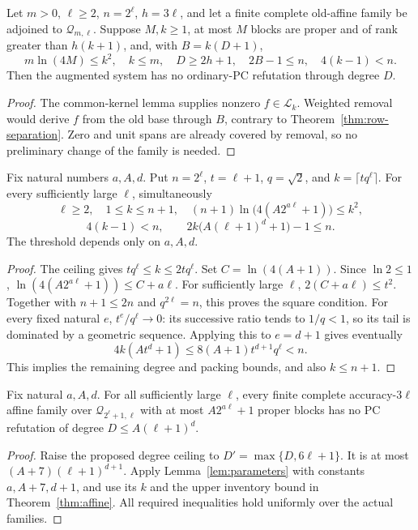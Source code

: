 \begin{theorem}\label{thm:affine}
Let \(m>0\), \(\ell\ge2\), \(n=2^\ell\), \(h=3\ell\), and let a finite
complete old-affine family be adjoined to \(\mathcal Q_{m,\ell}\).
Suppose \(M,k\ge1\), at most \(M\) blocks are proper and of rank greater
than \(h(k+1)\), and, with \(B=k(D+1)\),
\begin{equation}\label{eq:affine-room}
 m\ln(4M)\le k^2,\quad k\le m,\quad D\ge2h+1,\quad
 2B-1\le n,\quad4(k-1)<n.
\end{equation}
Then the augmented system has no ordinary-PC refutation through degree \(D\).
\end{theorem}
\begin{proof}
The common-kernel lemma supplies nonzero \(f\in\mathcal L_k\).
Weighted removal would derive \(f\) from the old base through \(B\),
contrary to Theorem~\ref{thm:row-separation}. Zero and unit spans are
already covered by removal, so no preliminary change of the family is needed.
\end{proof}

\begin{lemma}\label{lem:parameters}
Fix natural numbers \(a,A,d\). Put \(n=2^\ell\), \(t=\ell+1\),
\(q=\sqrt2\), and \(k=\lceil t q^\ell\rceil\).
For every sufficiently large \(\ell\), simultaneously
\[
 \ell\ge2,\quad 1\le k\le n+1,\quad
 (n+1)\ln\bigl(4(A2^{a\ell}+1)\bigr)\le k^2,
\]
\[
 4(k-1)<n,\qquad 2k\bigl(A(\ell+1)^d+1\bigr)-1\le n.
\]
The threshold depends only on \(a,A,d\).
\end{lemma}
\begin{proof}
The ceiling gives \(tq^\ell\le k\le2tq^\ell\).
Set \(C=\ln(4(A+1))\). Since \(\ln2\le1\),
\(\ln(4(A2^{a\ell}+1))\le C+a\ell\).
For sufficiently large \(\ell\), \(2(C+a\ell)\le t^2\).
Together with \(n+1\le2n\) and \(q^{2\ell}=n\), this proves the
square condition. For every fixed natural \(e\),
\(t^e/q^\ell\longrightarrow0\): its successive ratio tends to
\(1/q<1\), so its tail is dominated by a geometric sequence.
Applying this to \(e=d+1\) gives eventually
\[
 4k(At^d+1)\le8(A+1)t^{d+1}q^\ell<n.
\]
This implies the remaining degree and packing bounds, and also \(k\le n+1\).
\end{proof}

\begin{corollary}
\label{cor:polylog-exclusion}
Fix natural \(a,A,d\). For all sufficiently large \(\ell\), every finite
complete accuracy-\(3\ell\) affine family over \(\mathcal Q_{2^\ell+1,\ell}\)
with at most \(A2^{a\ell}+1\) proper blocks has no PC refutation of degree
\(D\le A(\ell+1)^d\).
\end{corollary}
\begin{proof}
Raise the proposed degree ceiling to \(D'=\max\{D,6\ell+1\}\).
It is at most \((A+7)(\ell+1)^{d+1}\). Apply
Lemma~\ref{lem:parameters} with constants \(a,A+7,d+1\), and use its
\(k\) and the upper inventory bound in Theorem~\ref{thm:affine}.
All required inequalities hold uniformly over the actual families.
\end{proof}

